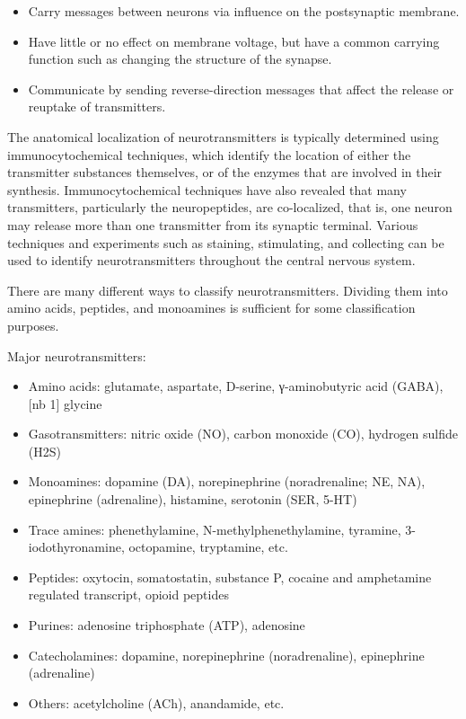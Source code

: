 \documentclass[]{book}
\providecommand{\tightlist}{%
  \setlength{\itemsep}{0pt}\setlength{\parskip}{0pt}}
\begin{document}
\begin{itemize}
\tightlist
\item
  Carry messages between neurons via influence on the postsynaptic membrane.
\item
  Have little or no effect on membrane voltage, but have a common carrying function such as changing the structure of the synapse.
\item
  Communicate by sending reverse-direction messages that affect the release or reuptake of transmitters.
\end{itemize}

The anatomical localization of neurotransmitters is typically determined using immunocytochemical techniques, which identify the location of either the transmitter substances themselves, or of the enzymes that are involved in their synthesis. Immunocytochemical techniques have also revealed that many transmitters, particularly the neuropeptides, are co-localized, that is, one neuron may release more than one transmitter from its synaptic terminal. Various techniques and experiments such as staining, stimulating, and collecting can be used to identify neurotransmitters throughout the central nervous system.

There are many different ways to classify neurotransmitters. Dividing them into amino acids, peptides, and monoamines is sufficient for some classification purposes.

Major neurotransmitters:

\begin{itemize}
\tightlist
\item
  Amino acids: glutamate, aspartate, D-serine, γ-aminobutyric acid (GABA),{[}nb 1{]} glycine
\item
  Gasotransmitters: nitric oxide (NO), carbon monoxide (CO), hydrogen sulfide (H2S)
\item
  Monoamines: dopamine (DA), norepinephrine (noradrenaline; NE, NA), epinephrine (adrenaline), histamine, serotonin (SER, 5-HT)
\item
  Trace amines: phenethylamine, N-methylphenethylamine, tyramine, 3-iodothyronamine, octopamine, tryptamine, etc.
\item
  Peptides: oxytocin, somatostatin, substance P, cocaine and amphetamine regulated transcript, opioid peptides
\item
  Purines: adenosine triphosphate (ATP), adenosine
\item
  Catecholamines: dopamine, norepinephrine (noradrenaline), epinephrine (adrenaline)
\item
  Others: acetylcholine (ACh), anandamide, etc.
\end{itemize}
\end{document}
